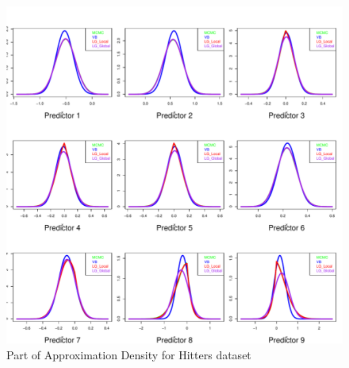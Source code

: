 \begin{figure}[h]
	\centering
	\includegraphics[page = 2, width=\linewidth,keepaspectratio]{lasso_densities_Hitters.pdf}
	\caption{Part of Approximation Density for Hitters dataset}
	\label{fig:hitters2}
\end{figure}



